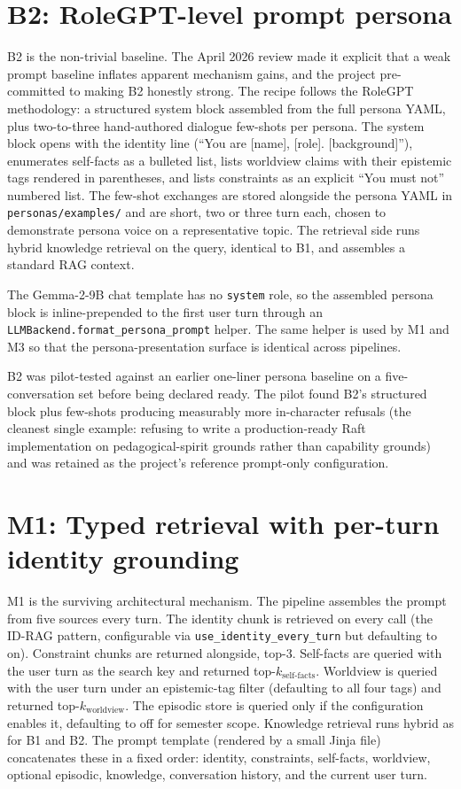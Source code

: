 \section{B2: RoleGPT-level prompt persona}

B2 is the non-trivial baseline. The April 2026 review made it explicit that a weak prompt baseline inflates apparent mechanism gains, and the project pre-committed to making B2 honestly strong. The recipe follows the RoleGPT methodology\autocite{rolegpt2023, rolellm2023}: a structured system block assembled from the full persona YAML, plus two-to-three hand-authored dialogue few-shots per persona. The system block opens with the identity line (``You are [name], [role]. [background]''), enumerates self-facts as a bulleted list, lists worldview claims with their epistemic tags rendered in parentheses, and lists constraints as an explicit ``You must not'' numbered list. The few-shot exchanges are stored alongside the persona YAML in \texttt{personas/examples/} and are short, two or three turn each, chosen to demonstrate persona voice on a representative topic. The retrieval side runs hybrid knowledge retrieval on the query, identical to B1, and assembles a standard RAG context.

The Gemma-2-9B chat template has no \texttt{system} role, so the assembled persona block is inline-prepended to the first user turn through an \texttt{LLMBackend.format\_persona\_prompt} helper. The same helper is used by M1 and M3 so that the persona-presentation surface is identical across pipelines.

B2 was pilot-tested against an earlier one-liner persona baseline on a five-conversation set before being declared ready. The pilot found B2's structured block plus few-shots producing measurably more in-character refusals (the cleanest single example: refusing to write a production-ready Raft implementation on pedagogical-spirit grounds rather than capability grounds) and was retained as the project's reference prompt-only configuration.

\section{M1: Typed retrieval with per-turn identity grounding}

M1 is the surviving architectural mechanism. The pipeline assembles the prompt from five sources every turn. The identity chunk is retrieved on every call (the ID-RAG pattern\autocite{idrag2024}, configurable via \texttt{use\_identity\_every\_turn} but defaulting to on). Constraint chunks are returned alongside, top-3. Self-facts are queried with the user turn as the search key and returned top-$k_{\text{self-facts}}$. Worldview is queried with the user turn under an epistemic-tag filter (defaulting to all four tags) and returned top-$k_{\text{worldview}}$. The episodic store is queried only if the configuration enables it, defaulting to off for semester scope. Knowledge retrieval runs hybrid as for B1 and B2. The prompt template (rendered by a small Jinja file) concatenates these in a fixed order: identity, constraints, self-facts, worldview, optional episodic, knowledge, conversation history, and the current user turn.


